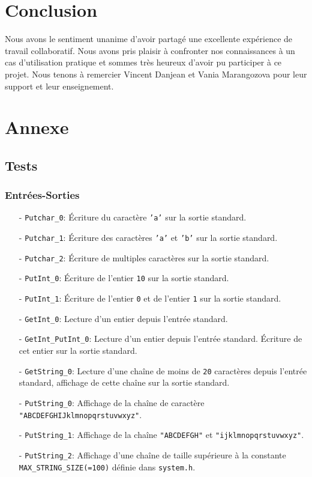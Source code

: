 \documentclass[11pt]{article}
\theoremstyle{definition}
\theoremstyle{definition}
\begin{document}
\section{Conclusion}
Nous avons le sentiment unanime d'avoir partagé une excellente expérience de travail collaboratif. Nous avons pris plaisir à confronter nos connaissances à un cas d'utilisation pratique et sommes très heureux d'avoir pu participer à ce projet. Nous tenons à remercier Vincent Danjean et Vania Marangozova pour leur support et leur enseignement.
\section{Annexe}

\subsection{Tests}

\subsubsection{Entrées-Sorties}
\begin{itemize}
\item[-] \texttt{Putchar\_0}: Écriture du caractère \texttt{'a'} sur la sortie standard.
\item[-] \texttt{Putchar\_1}: Écriture des caractères \texttt{'a'} et \texttt{'b'} sur la sortie standard.
\item[-] \texttt{Putchar\_2}: Écriture de multiples caractères sur la sortie standard.
\item[-] \texttt{PutInt\_0}: Écriture de l'entier \texttt{10} sur la sortie standard.
\item[-] \texttt{PutInt\_1}: Écriture de l'entier \texttt{0} et de l'entier \texttt{1} sur la sortie standard.
\item[-] \texttt{GetInt\_0}: Lecture d'un entier depuis l'entrée standard.
\item[-] \texttt{GetInt\_PutInt\_0}:
  Lecture d'un entier depuis l'entrée standard.
  Écriture de cet entier sur la sortie standard.
\item[-] \texttt{GetString\_0}: Lecture d'une chaîne de moins de \texttt{20} caractères depuis l'entrée standard, affichage de cette chaîne sur la sortie standard.
\item[-] \texttt{PutString\_0}: Affichage de la chaîne de caractère \texttt{"ABCDEF}\hspace{0pt}\texttt{GHIJklmnop}\hspace{0pt}\texttt{qrstuvwxyz"}.
\item[-] \texttt{PutString\_1}: Affichage de la chaîne \texttt{"ABCDEFGH"} et \texttt{"ijklmnopqrstuvwxyz"}.
\item[-] \texttt{PutString\_2}:   Affichage d'une chaîne de taille supérieure à la
  constante \texttt{MAX\_STRING\_SIZE(=100)} définie dans \texttt{system.h}.
\end{itemize}
\end{document}
